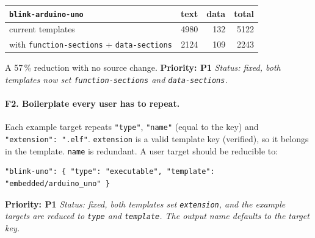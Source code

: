 \documentclass[11pt,a4paper]{article}
\newcommand{\pkg}[1]{\texttt{#1}}
\newcommand{\prio}[1]{\textbf{Priority: #1}}
\begin{document}
\begin{center}
\begin{tabular}{lrrr}
\toprule
\pkg{blink-arduino-uno} & text & data & total \\
\midrule
current templates & 4980 & 132 & 5122 \\
with \pkg{function-sections} + \pkg{data-sections} & 2124 & 109 & 2243 \\
\bottomrule
\end{tabular}
\end{center}

\noindent
A 57\,\% reduction with no source change. \prio{P1}
\textit{Status: fixed, both templates now set \pkg{function-sections} and \pkg{data-sections}.}

\paragraph{F2. Boilerplate every user has to repeat.}
Each example target repeats \pkg{"type"}, \pkg{"name"} (equal to the key) and
\pkg{"extension": ".elf"}. \pkg{extension} is a valid template key (verified), so it belongs in
the template. \pkg{name} is redundant. A user target should be reducible to:

\begin{lstlisting}
"blink-uno": { "type": "executable", "template": "embedded/arduino_uno" }
\end{lstlisting}
\prio{P1}
\textit{Status: fixed, both templates set \pkg{extension}, and the example targets are reduced to \pkg{type} and \pkg{template}. The output name defaults to the target key.}
\end{document}
